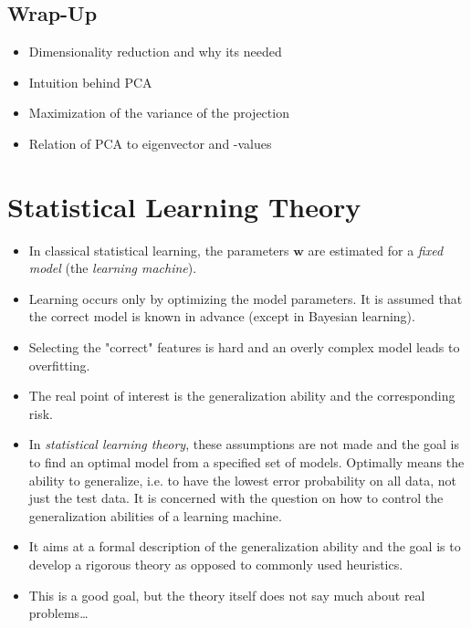 \documentclass[a4paper, 11pt, accentcolor = tud3b]{tudreport}
\renewcommand{\vec}[1]{\mathbf{#1}}
\begin{document}
		\section{Wrap-Up}
			\begin{itemize}
				\item Dimensionality reduction and why its needed
				\item Intuition behind PCA
				\item Maximization of the variance of the projection
				\item Relation of PCA to eigenvector and -values
			\end{itemize}

	\chapter{Statistical Learning Theory}
		\begin{itemize}
			\item In classical statistical learning, the parameters \(\vec{w}\) are estimated for a \emph{fixed model} (the \emph{learning machine}).
			\item Learning occurs only by optimizing the model parameters. It is assumed that the correct model is known in advance (except in Bayesian learning).
			\item Selecting the "correct" features is hard and an overly complex model leads to overfitting.
			\item The real point of interest is the generalization ability and the corresponding risk.
			\item In \emph{statistical learning theory}, these assumptions are not made and the goal is to find an optimal model from a specified set of models. Optimally means the ability to generalize, i.e. to have the lowest error probability on all data, not just the test data. It is concerned with the question on how to control the generalization abilities of a learning machine.
			\item It aims at a formal description of the generalization ability and the goal is to develop a rigorous theory as opposed to commonly used heuristics.
			\item This is a good goal, but the theory itself does not say much about real problems\dots
		\end{itemize}
\end{document}
